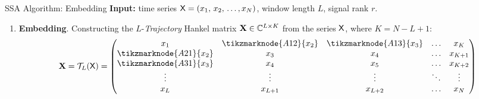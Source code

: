\documentclass[pdf, unicode, ucs, notheorems]{beamer}
\theoremstyle{definition}
\begin{document}
\begin{frame}{SSA Algorithm: Embedding}
  \textbf{Input:} time series $\mathsf{X} = (x_1,\, x_2,\, \ldots, x_N)$,
  window length $L$, signal rank $r$.
  \vspace{0.4cm}\\
  \begin{enumerate}
    \item \textbf{Embedding}.
      Constructing the $L$-\emph{Trajectory} Hankel matrix $\mathbf{X}\in
      \mathbb{C}^{L \times K}$ from the series $\mathsf{X}$, where $K = N - L + 1$:\\
      \[
        \bfX = \calT_{L}(\tX) =
        \begin{pmatrix}
          x_1                     & \tikzmarknode{A12}{x_2} &
          \tikzmarknode{A13}{x_3} & \ldots & x_K     \\
          \tikzmarknode{A21}{x_2} & x_3                     & x_4
          & \ldots & x_{K+1} \\
          \tikzmarknode{A31}{x_3} & x_4                     & x_5
          & \ldots & x_{K+2} \\
          \vdots                  & \vdots                  & \vdots
          & \ddots & \vdots  \\
          x_L                     & x_{L+1}                 & x_{L+2}
          & \ldots & x_N
        \end{pmatrix}
      \]
  \end{enumerate}
\end{frame}
\end{document}
